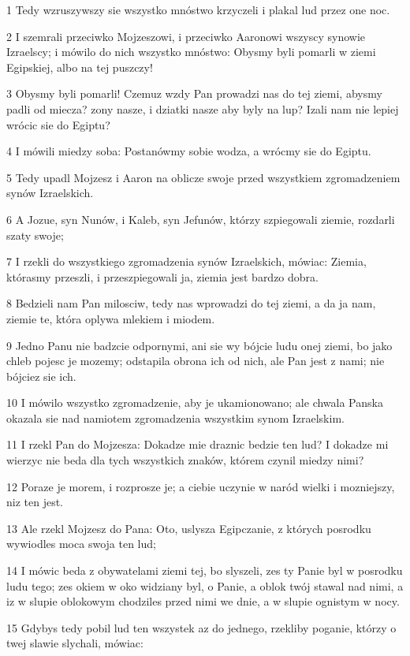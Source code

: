 \par 1 Tedy wzruszywszy sie wszystko mnóstwo krzyczeli i plakal lud przez one noc.
\par 2 I szemrali przeciwko Mojzeszowi, i przeciwko Aaronowi wszyscy synowie Izraelscy; i mówilo do nich wszystko mnóstwo: Obysmy byli pomarli w ziemi Egipskiej, albo na tej puszczy!
\par 3 Obysmy byli pomarli! Czemuz wzdy Pan prowadzi nas do tej ziemi, abysmy padli od miecza? zony nasze, i dziatki nasze aby byly na lup? Izali nam nie lepiej wrócic sie do Egiptu?
\par 4 I mówili miedzy soba: Postanówmy sobie wodza, a wrócmy sie do Egiptu.
\par 5 Tedy upadl Mojzesz i Aaron na oblicze swoje przed wszystkiem zgromadzeniem synów Izraelskich.
\par 6 A Jozue, syn Nunów, i Kaleb, syn Jefunów, którzy szpiegowali ziemie, rozdarli szaty swoje;
\par 7 I rzekli do wszystkiego zgromadzenia synów Izraelskich, mówiac: Ziemia, którasmy przeszli, i przeszpiegowali ja, ziemia jest bardzo dobra.
\par 8 Bedzieli nam Pan milosciw, tedy nas wprowadzi do tej ziemi, a da ja nam, ziemie te, która oplywa mlekiem i miodem.
\par 9 Jedno Panu nie badzcie odpornymi, ani sie wy bójcie ludu onej ziemi, bo jako chleb pojesc je mozemy; odstapila obrona ich od nich, ale Pan jest z nami; nie bójciez sie ich.
\par 10 I mówilo wszystko zgromadzenie, aby je ukamionowano; ale chwala Panska okazala sie nad namiotem zgromadzenia wszystkim synom Izraelskim.
\par 11 I rzekl Pan do Mojzesza: Dokadze mie draznic bedzie ten lud? I dokadze mi wierzyc nie beda dla tych wszystkich znaków, którem czynil miedzy nimi?
\par 12 Poraze je morem, i rozprosze je; a ciebie uczynie w naród wielki i mozniejszy, niz ten jest.
\par 13 Ale rzekl Mojzesz do Pana: Oto, uslysza Egipczanie, z których posrodku wywiodles moca swoja ten lud;
\par 14 I mówic beda z obywatelami ziemi tej, bo slyszeli, zes ty Panie byl w posrodku ludu tego; zes okiem w oko widziany byl, o Panie, a oblok twój stawal nad nimi, a iz w slupie oblokowym chodziles przed nimi we dnie, a w slupie ognistym w nocy.
\par 15 Gdybys tedy pobil lud ten wszystek az do jednego, rzekliby poganie, którzy o twej slawie slychali, mówiac:
